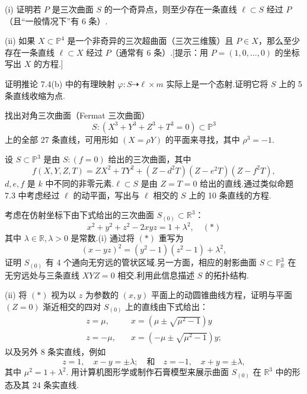 \begin{exercise}
(i) 证明若 \(P\) 是三次曲面 \(S\) 的一个奇异点，则至少存在一条直线 \(\ell \subset S\) 经过 \(P\)（且“一般情况下”有 6 条）.

(ii) 如果 \(X \subset {\mathbb{P}}^{4}\) 是一个非奇异的三次超曲面（三次三维簇）且 \(P \in X\)，那么至少存在一条直线 \(\ell \subset X\) 经过 \(P\)（通常有 6 条）.[提示：用 \(P=(1,0,\dots,0)\) 的坐标写出 \(X\) 的方程.]
\end{exercise}

\begin{exercise}
证明推论 7.4(b) 中的有理映射 \(\varphi: S \dashrightarrow \ell \times m\) 实际上是一个态射.证明它将 \(S\) 上的 5 条直线收缩为点.
\end{exercise}

\begin{exercise}
找出对角三次曲面（Fermat 三次曲面）
\[
S: (X^3 + Y^3 + Z^3 + T^3 = 0) \subset {\mathbb{P}}^{3}
\]
上的全部 27 条直线，可用形如 \((X = \rho Y)\) 的平面来寻找，其中 \(\rho^3=-1\).
\end{exercise}

\begin{exercise}
设 \(S \subset {\mathbb{P}}^{3}\) 是由 \(S: (f=0)\) 给出的三次曲面，其中
\[
f(X,Y,Z,T) = ZX^2 + TY^2 + (Z-d^2T)(Z-e^2T)(Z-f^2T),
\]
\(d,e,f\) 是 \(k\) 中不同的非零元素.\(\ell \subset S\) 是由 \(Z=T=0\) 给出的直线.通过类似命题 7.3 中考虑经过 \(\ell\) 的动平面，写出与 \(\ell\) 相交的 \(S\) 上的 10 条直线的方程.
\end{exercise}

\begin{exercise}[由 R. Casdagli 提出]
考虑在仿射坐标下由下式给出的三次曲面 \(S_{(0)} \subset {\mathbb{R}}^{3}\)：
\[
x^2 + y^2 + z^2 - 2xyz = 1 + \lambda^2, \quad (*)
\]
其中 \(\lambda \in \mathbb{R}, \lambda > 0\) 是常数.(i) 通过将 \((*)\) 重写为
\[
(x-yz)^2 = (y^2-1)(z^2-1) + \lambda^2,
\]
证明 \(S_{(0)}\) 有 4 个通向无穷远的管状区域.另一方面，相应的射影曲面 \(S \subset {\mathbb{P}}_{\mathbb{R}}^{3}\) 在无穷远处与三条直线 \(XYZ=0\) 相交.利用此信息描述 \(S\) 的拓扑结构.

(ii) 将 \((*)\) 视为以 \(z\) 为参数的 \((x,y)\) 平面上的动圆锥曲线方程，证明与平面 \((Z=0)\) 渐近相交的四对 \(S_{(0)}\) 上的直线由下式给出：
\begin{align*}
z = \mu, &\quad x = (\mu \pm \sqrt{\mu^2-1})y \\
z = -\mu, &\quad x = (-\mu \pm \sqrt{\mu^2-1})y;
\end{align*}
以及另外 8 条实直线，例如
\[
z=1, \quad x-y = \pm\lambda; \quad \text{和} \quad z=-1, \quad x+y = \pm\lambda,
\]
其中 \(\mu^2 = 1+\lambda^2\).
用计算机图形学或制作石膏模型来展示曲面 \(S_{(0)}\) 在 \({\mathbb{R}}^{3}\) 中的形态及其 24 条实直线.
\end{exercise}

